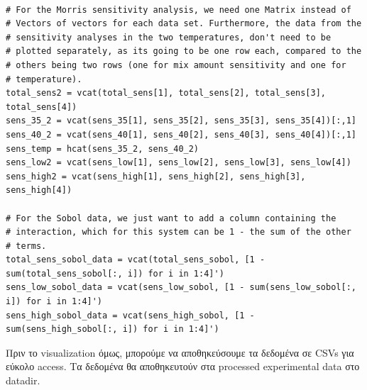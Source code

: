 \documentclass[11pt]{article}
\begin{document}
\begin{verbatim}

# For the Morris sensitivity analysis, we need one Matrix instead of
# Vectors of vectors for each data set. Furthermore, the data from the
# sensitivity analyses in the two temperatures, don't need to be
# plotted separately, as its going to be one row each, compared to the
# others being two rows (one for mix amount sensitivity and one for
# temperature).
total_sens2 = vcat(total_sens[1], total_sens[2], total_sens[3], total_sens[4])
sens_35_2 = vcat(sens_35[1], sens_35[2], sens_35[3], sens_35[4])[:,1]
sens_40_2 = vcat(sens_40[1], sens_40[2], sens_40[3], sens_40[4])[:,1]
sens_temp = hcat(sens_35_2, sens_40_2)
sens_low2 = vcat(sens_low[1], sens_low[2], sens_low[3], sens_low[4])
sens_high2 = vcat(sens_high[1], sens_high[2], sens_high[3], sens_high[4])

# For the Sobol data, we just want to add a column containing the
# interaction, which for this system can be 1 - the sum of the other
# terms.
total_sens_sobol_data = vcat(total_sens_sobol, [1 - sum(total_sens_sobol[:, i]) for i in 1:4]')
sens_low_sobol_data = vcat(sens_low_sobol, [1 - sum(sens_low_sobol[:, i]) for i in 1:4]')
sens_high_sobol_data = vcat(sens_high_sobol, [1 - sum(sens_high_sobol[:, i]) for i in 1:4]')

\end{verbatim}

Πριν το visualization όμως, μπορούμε να αποθηκεύσουμε τα δεδομένα σε CSVs για εύκολο access. Τα δεδομένα θα αποθηκευτούν στα processed experimental data στο datadir.
\end{document}
